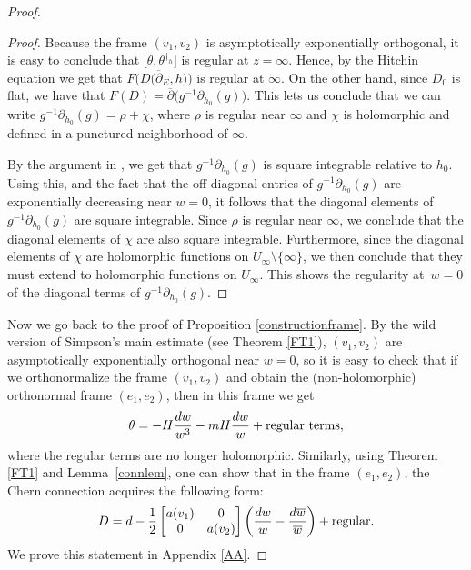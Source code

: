 \documentclass[11pt]{article}
\numberwithin{equation}{section}
\numberwithin{equation}{section}
\begin{document}
\begin{proof}
\begin{proof}
Because the frame $(v_1,v_2)$ is asymptotically exponentially orthogonal, it is easy to conclude that $\bigl[\theta,\theta^{\dagger_h}\bigr]$ is regular at $z=\infty$. Hence, by the Hitchin equation we get that $F\bigl(D\bigl(\overline{\partial}_E,h\bigr)\bigr)$ is regular at $\infty$. On the other hand, since $D_0$ is flat, we have that $F(D)=\overline{\partial}\bigl(g^{-1}\partial_{h_0}(g)\bigr)$. This lets us conclude that we can write $g^{-1}\partial_{h_0}(g)=\rho + \chi$, where $\rho$ is regular near $\infty$ and $\chi$ is holomorphic and defined in a punctured neighborhood of $\infty$.

By the argument in \cite[Proposition 10.3.3]{M}, we get that $g^{-1}\partial_{h_0}(g)$ is square integrable relative to $h_0$. Using this, and the fact that the off-diagonal entries of $g^{-1}\partial_{h_0}(g)$ are exponentially decreasing near $w=0$, it follows that the diagonal elements of $g^{-1}\partial_{h_0}(g)$ are square integrable. Since $\rho$ is regular near $\infty$, we conclude that the diagonal elements of $\chi$ are also square integrable. Furthermore, since the diagonal elements of $\chi$ are holomorphic functions on $U_{\infty}\setminus \{\infty\}$, we then conclude that they must extend to holomorphic functions on $U_{\infty}$. This shows the regularity at~${w=0}$ of the diagonal terms of $g^{-1}\partial_{h_0}(g)$.
\end{proof}

Now we go back to the proof of Proposition \ref{constructionframe}. By the wild version of Simpson's main estimate (see Theorem \ref{FT1}), $(v_1,v_2)$ are asymptotically exponentially orthogonal near $w=0$, so it is easy to check that if we orthonormalize the frame $(v_1,v_2)$ and obtain the (non-holomorphic) orthonormal frame $(e_1,e_2)$, then in this frame we get
\begin{equation}\label{higgscan}
 \theta=-H\frac{{\rm d}w}{w^3}-mH\frac{{\rm d}w}{w}+\text{regular terms},
\end{equation}
where the regular terms are no longer holomorphic. Similarly, using Theorem \ref{FT1} and Lem\-ma~\ref{connlem}, one can show that in the frame $(e_1,e_2)$, the Chern connection acquires the following form:
\begin{equation}\label{Dlemexp}
 D={\rm d} - \frac{1}{2}\begin{bmatrix} a(v_1) & 0 \\
 0 & a(v_2) \\
 \end{bmatrix}\left(\frac{{\rm d}w}{w}- \frac{{\rm d}\overline{w}}{\overline{w}}\right) + \text{regular}.
\end{equation}
We prove this statement in Appendix \ref{AA}.


\end{proof}
\end{document}
